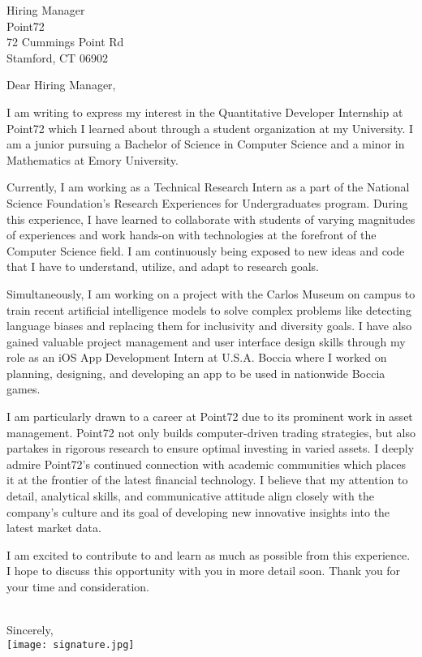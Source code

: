 \documentclass[letterpaper,12pt]{letter}
\date{}
\begin{document}
\begin{letter}{%
    Hiring Manager \\ 
    Point72  \\ 
    72 Cummings Point Rd \\
    Stamford, CT 06902
}

\opening{Dear Hiring Manager,}

I am writing to express my interest in the Quantitative Developer Internship at Point72
which I learned about through a student organization at my University. I am a junior pursuing 
a Bachelor of Science in Computer Science and a minor in Mathematics at Emory University.

Currently, I am working as a Technical Research Intern as a part of the National Science Foundation's 
Research Experiences for Undergraduates program. During this experience, I have learned to 
collaborate with students of varying magnitudes of experiences and work hands-on with technologies at 
the forefront of the Computer Science field. I am continuously being exposed to new ideas 
and code that I have to understand, utilize, and adapt to research goals. 

Simultaneously, I am working on a project with the Carlos Museum on campus to train recent 
artificial intelligence models to solve complex problems like detecting language biases and 
replacing them for inclusivity and diversity goals. I have also gained valuable project management 
and user interface design skills through my role as an iOS App Development Intern at U.S.A. Boccia 
where I worked on planning, designing, and developing an app to be used in nationwide Boccia games. 

I am particularly drawn to a career at Point72 due to its prominent work in asset management. 
Point72 not only builds computer-driven trading strategies, but also partakes in rigorous research to 
ensure optimal investing in varied assets. I deeply admire Point72's continued connection with academic
communities which places it at the frontier of the latest financial technology. I believe that 
my attention to detail, analytical skills, and communicative attitude align closely with the 
company’s culture and its goal of developing new innovative insights into the latest market data.

I am excited to contribute to and learn as much as possible from this experience. I hope to discuss
this opportunity with you in more detail soon. Thank you for your time and consideration. \\\\

\closing{Sincerely, \\
\vspace{10pt}
\texttt{[image: signature.jpg]}}


\end{letter}

\end{document}
